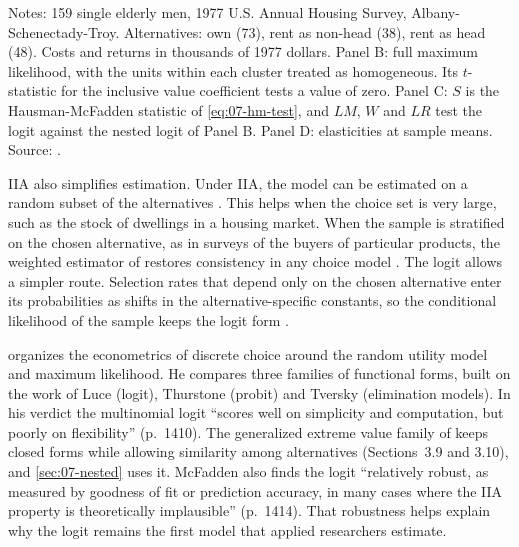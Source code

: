 \begin{table}[htbp]
\vspace{4pt}
\begin{minipage}{0.86\textwidth}
\footnotesize Notes: 159 single elderly men, 1977 U.S. Annual Housing Survey, Albany-Schenectady-Troy.
Alternatives: own (73), rent as non-head (38), rent as head (48). Costs and returns in thousands of 1977
dollars. Panel B: full maximum likelihood, with the units within each cluster treated as homogeneous. Its
$t$-statistic for the inclusive value coefficient tests a value of zero. Panel C: $S$ is the Hausman-McFadden
statistic of \eqref{eq:07-hm-test}, and $LM$, $W$ and $LR$ test the logit against the nested logit of Panel B.
Panel D: elasticities at sample means. Source: \citet[Tables 3.2 to 3.4 and pp.~1430--1431]{McFadden1984}.
\end{minipage}
\end{table}

IIA also simplifies estimation. Under IIA, the model can be estimated on a random subset of the alternatives
\citep[Section~3.6]{McFadden1984}. This helps when the choice set is very large, such as the stock of dwellings
in a housing market. When the sample is stratified on the chosen alternative, as in surveys of the buyers of
particular products, the weighted estimator of \citet{ManskiLerman1977} restores consistency in any choice
model \citep[Section~4.4]{McFadden1984}. The logit allows a simpler route. Selection rates that depend only on
the chosen alternative enter its probabilities as shifts in the alternative-specific constants, so the
conditional likelihood of the sample keeps the logit form \citep[eq.~4.15]{McFadden1984}.

\citet{McFadden1984} organizes the econometrics of discrete choice around the random utility model and
maximum likelihood. He compares three families of functional forms, built on the work of Luce (logit),
Thurstone (probit) and Tversky (elimination models). In his verdict the multinomial logit ``scores well on
simplicity and computation, but poorly on flexibility'' (p.~1410). The generalized extreme value family of
\citet{McFadden1978} keeps closed forms while allowing similarity among alternatives (Sections~3.9 and 3.10), and
\cref{sec:07-nested} uses it. McFadden also finds the logit ``relatively robust, as measured by goodness of fit
or prediction accuracy, in many cases where the IIA property is theoretically implausible'' (p.~1414). That
robustness helps explain why the logit remains the first model that applied researchers estimate.

